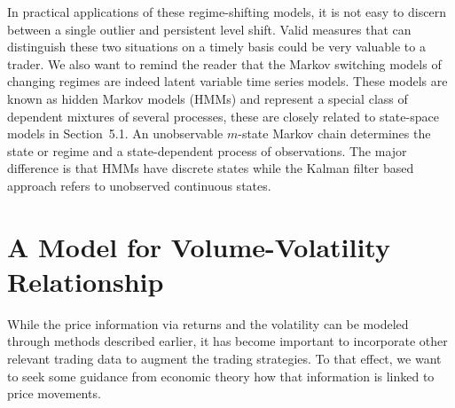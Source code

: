 In practical applications of these regime-shifting models, it is not easy to discern between a single outlier and persistent level shift. Valid measures that can distinguish these two situations on a timely basis could be very valuable to a trader. We also want to remind the reader that the Markov switching models of changing regimes are indeed latent variable time series models. These models are known as hidden Markov models (HMMs) and represent a special class of dependent mixtures of several processes, these are closely related to state-space models in Section~5.1. An unobservable $m$-state Markov chain determines the state or regime and a state-dependent process of observations. The major difference is that HMMs have discrete states while the Kalman filter based approach refers to unobserved continuous states. 



\section{A Model for Volume-Volatility Relationship \label{s:model_volvol_rel}}


While the price information via returns and the volatility can be modeled through methods described earlier, it has become important to incorporate other relevant trading data to augment the trading strategies. To that effect, we want to seek some guidance from economic theory how that information is linked to price movements.


